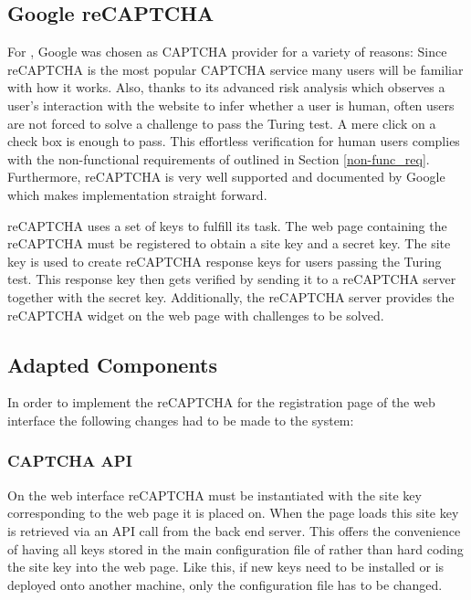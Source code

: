 \subsection{Google reCAPTCHA}
For \lcs, Google  was chosen as CAPTCHA provider for a variety of reasons: Since reCAPTCHA is the most popular CAPTCHA service many users will be familiar with how it works. \cite{google_recaptcha} Also, thanks to its advanced risk analysis which observes a user's interaction with the website to infer whether a user is human, often users are not forced to solve a challenge to pass the Turing test. A mere click on a check box is enough to pass.  \cite{google_recaptcha} This effortless verification for human users complies with the non-functional requirements of \lcs outlined in Section \ref{non-func_req}. 
Furthermore, reCAPTCHA is very well supported and documented by Google which makes implementation straight forward.

reCAPTCHA uses a set of keys to fulfill its task. The web page containing the reCAPTCHA must be registered to obtain a site key and a secret key. The site key is used to create reCAPTCHA response keys for users passing the Turing test. This response key then gets verified by sending it to a reCAPTCHA server together with the secret key. Additionally, the reCAPTCHA server provides the reCAPTCHA widget on the web page with challenges to be solved. 

\subsection{Adapted Components}

In order to implement the reCAPTCHA for the registration page of the web interface the following changes had to be made to the system:

\subsubsection{CAPTCHA API}

On the web interface reCAPTCHA must be instantiated with the site key corresponding to the web page it is placed on. When the page loads this site key is retrieved via an API call from the back end server. This offers the convenience of having all keys stored in the main configuration file of \lcs rather than hard coding the site key into the web page. Like this, if new keys need to be installed or \lcs is deployed onto another machine, only the configuration file has to be changed. 

